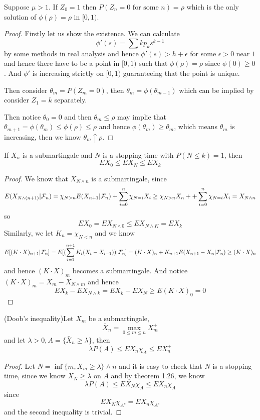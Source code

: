 \begin{theorem}
    Suppose $\mu>1$. If $Z_0 = 1$ then $P(Z_n = 0\text{ for some }n) = \rho$ which is the only solution of $\phi(\rho) = \rho$ in $[0,1)$.    
\end{theorem}
\begin{proof}\par
    Firstly let us show the existence. We can calculate
    \[\phi'(s) = \sum kp_ks^{k-1}\]
    by some methods in real analysis and hence $\phi'(s) > h+\epsilon$ for some $\epsilon > 0$ near $1$ and hence there have to be a point in $[0,1)$ such that $\phi(\rho) = \rho$ since $\phi(0)\geq 0$. And $\phi'$ is increasing strictly on $[0,1)$ guaranteeing that the point is unique.\par
    Then consider $\theta_m = P(Z_m = 0)$, then $\theta_m = \phi(\theta_{m-1})$ which can be implied by consider $Z_1 = k$ separately.\par
    Then notice $\theta_0 = 0$ and then $\theta_m \leq \rho$ may implie that $\theta_{m+1} = \phi(\theta_m) \leq \phi(\rho) \leq \rho$ and hence $\phi(\theta_m) \geq \theta_m$, which means $\theta_m$ is increasing, then we know $\theta_m \uparrow \rho$.
\end{proof}

\begin{theorem}
    If $X_n$ is a submartingale and $N$ is a stopping time with $P(N\leq k )= 1$, then 
    \[
    EX_0 \leq EX_N \leq EX_k
    \]
\end{theorem}
\begin{proof}\par
    We know that $X_{N\wedge n}$ is a submartingale, since
    \[E(X_{N\wedge(n+1)}|\mathcal{F}_n) = \chi_{N>n}E(X_{n+1}|\mathcal{F}_n) + \sum\limits_{i=0}^n \chi_{N = i}X_i \geq \chi_{N>n}X_n + + \sum\limits_{i=0}^n \chi_{N = i}X_i= X_{N\wedge n}\]
    so
    \[EX_0 = EX_{N\wedge 0} \leq EX_{N\wedge K} = EX_k\]
    Similarly, we let $K_n = \chi_{N < n}$ and we know
    \[
        E[(K\cdot X)_{n+1}|\mathcal{F}_n] = E[(\sum\limits_{i=1}^{n+1}K_i(X_i-X_{i-1}))|\mathcal{F}_n] = (K\cdot X)_n + K_{n+1}E(X_{n+1}-X_n|\mathcal{F}_n) \geq (K\cdot X)_n
    \]
    and hence $(K\cdot X)_m$ becomes a submartingale. And notice $(K\cdot X)_m = X_m - X_{N\wedge m}$ and hence
    \[EX_k - EX_{N\wedge k} = EX_k - EX_N \geq E(K\cdot X)_0 = 0\]
\end{proof}

\begin{theorem}
    (Doob's inequality)Let $X_m$ be a submartingale, 
    \[\bar{X}_n = \max_{0\leq m \leq n}X_m^+\]
    and let $\lambda >0, A = \{\bar{X}_n \geq \lambda\}$, then
    \[\lambda P(A) \leq EX_n\chi_A \leq EX_n^+\]
\end{theorem}
\begin{proof}\par
    Let $N = \inf\{m, X_m \geq \lambda\}\wedge n$ and it is easy to check that $N$ is a stopping time, since we know $X_N \geq \lambda$ on $A$ and by theorem 1.26, we know
    \[\lambda P(A) \leq EX_N\chi_A \leq EX_n\chi_A\]
    since
    \[EX_N\chi_{A^c} = EX_n\chi_{A^c}\]
    and the second inequality is trivial.
\end{proof}

